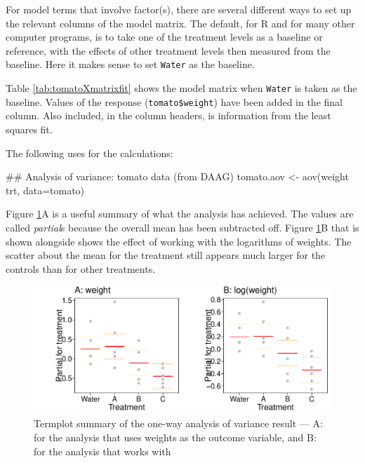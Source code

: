 For model terms that involve factor(s), there are several different
ways to set up the relevant columns of the model matrix.  The default,
for R and for many other computer programs, is to take one of the
treatment levels as a baseline or reference, with the effects of other
treatment levels then measured from the baseline.  Here it makes sense
to set \verb!Water! as the baseline.

Table \ref{tab:tomatoXmatrixfit} shows the model matrix when
\verb!Water! is taken as the baseline.  Values of the response
(\verb!tomato$weight!)  have been added in the final column. Also
included, in the column headers, is information from the least squares
fit.

The following uses  for the calculations:
\begin{Schunk}
\begin{Sinput}
## Analysis of variance: tomato data (from DAAG)
tomato.aov <- aov(weight ~ trt, data=tomato)
\end{Sinput}
\end{Schunk}

Figure \ref{fig:tomatoterm}A is a useful summary of what the analysis
has achieved. The values are called {\em partial}s because the
overall mean has been  subtracted off.  Figure \ref{fig:tomatoterm}B
that is shown alongside shows the effect of working with the logarithms
of weights.  The scatter  about the mean for the treatment still
appears much larger for the controls than for other treatments.
\begin{figure}
\begin{Schunk}


\centerline{\includegraphics[width=\textwidth]{figs/8-termplot-aovAB-1} }

\end{Schunk}
 \caption{Termplot summary of the one-way analysis of variance result ---
A: for the analysis that uses weights as the outcome variable, and
B: for the analysis that works with }
\label{fig:tomatoterm}
\end{figure}

